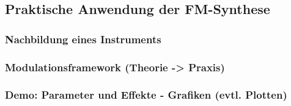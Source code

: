 \subsection{Praktische Anwendung der FM-Synthese}

\subsubsection{Nachbildung eines Instruments}
\subsubsection{Modulationsframework (Theorie -> Praxis)}
\subsubsection{Demo: Parameter und Effekte - Grafiken (evtl. Plotten)}